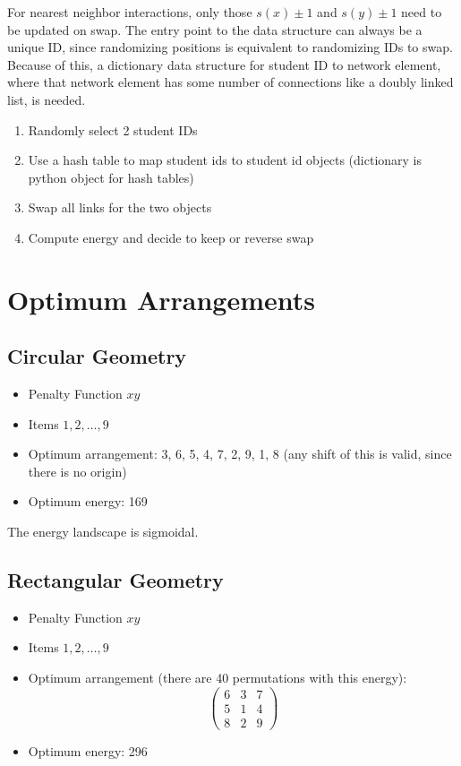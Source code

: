 \documentclass{article}
\begin{document}
For nearest neighbor interactions, only those $s(x) \pm 1$ and $s(y) \pm 1$ need to be updated on swap. The entry point to the data structure can always be a unique ID, since randomizing positions is equivalent to randomizing IDs to swap. Because of this, a dictionary data structure for student ID to network element, where that network element has some number of connections like a doubly linked list, is needed.

\begin{enumerate}
    \item Randomly select 2 student IDs
    \item Use a hash table to map student ids to student id objects (dictionary is python object for hash tables) 
    \item Swap all links for the two objects
    \item Compute energy and decide to keep or reverse swap
\end{enumerate}

\appendix

\section{Optimum Arrangements}
\subsection{Circular Geometry}
\begin{itemize}
    \item Penalty Function $xy$
    \item Items $1, 2, \ldots, 9$
    \item Optimum arrangement: 3, 6, 5, 4, 7, 2, 9, 1, 8 (any shift of this is valid, since there is no origin)
    \item Optimum energy: 169
\end{itemize}

The energy landscape is sigmoidal.

\subsection{Rectangular Geometry}

\begin{itemize}
    \item Penalty Function $xy$
    \item Items $1, 2, \ldots, 9$
    \item Optimum arrangement (there are 40 permutations with this energy): 
        \begin{equation}
        \begin{pmatrix}
            6 & 3 & 7 \\
            5 & 1 & 4 \\
            8 & 2 & 9
        \end{pmatrix}
        \end{equation}
    \item Optimum energy: 296
\end{itemize}
\end{document}

